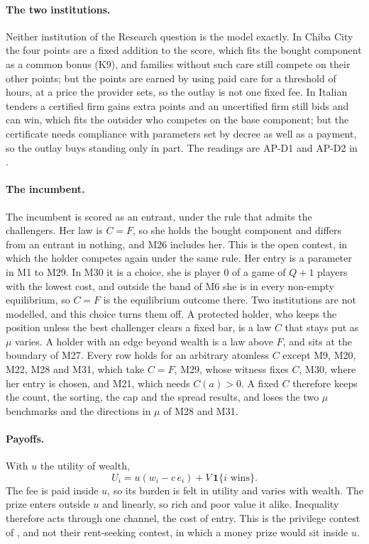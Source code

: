 \paragraph{The two institutions.} Neither institution of the Research question
is the model exactly. In Chiba City the four points are a fixed addition to the
score, which fits the bought component as a common bonus (K9), and families
without such care still compete on their other points; but the points are
earned by using paid care for a threshold of hours, at a price the provider
sets, so the outlay is not one fixed fee. In Italian tenders a certified firm
gains extra points and an uncertified firm still bids and can win, which fits
the outsider who competes on the base component; but the certificate needs
compliance with parameters set by decree as well as a payment, so the outlay
buys standing only in part. The readings are AP-D1 and AP-D2 in
.

\paragraph{The incumbent.} The incumbent is scored as an entrant, under the
rule that admits the challengers. Her law is $C=F$, so she holds the bought
component and differs from an entrant in nothing, and M26 includes her. This is the open contest,
in which the holder competes again under the same rule. Her entry is a
parameter in M1 to M29. In M30 it is a choice, she is player $0$ of a game of
$Q+1$ players with the lowest cost, and outside the band of M6 she is in every
non-empty equilibrium, so $C=F$ is the equilibrium outcome there. Two
institutions are not modelled, and this choice turns them off. A protected
holder, who keeps the position unless the best challenger clears a fixed bar,
is a law $C$ that stays put as $\mu$ varies. A holder with an edge beyond
wealth is a law above $F$, and sits at the boundary of M27. Every row holds
for an arbitrary atomless $C$ except M9, M20, M22, M28 and M31, which take
$C=F$, M29, whose witness fixes $C$, M30, where her entry is chosen, and M21,
which needs $C(a)>0$. A fixed $C$ therefore keeps the count, the sorting, the
cap and the spread results, and loses the two $\mu$ benchmarks and the
directions in $\mu$ of M28 and M31.

\paragraph{Payoffs.} With $u$ the utility of wealth,
\[
  U_i=u(w_i-c\,e_i)+V\,\mathbf 1\{i\text{ wins}\}.
\]
The fee is paid inside $u$, so its burden is felt in utility and varies with
wealth. The prize enters outside $u$ and linearly, so rich and poor value it
alike. Inequality therefore acts through one channel, the cost of entry. This
is the privilege contest of \citet{SchroyenTreich2016}, and not their
rent-seeking contest, in which a money prize would sit inside $u$.

